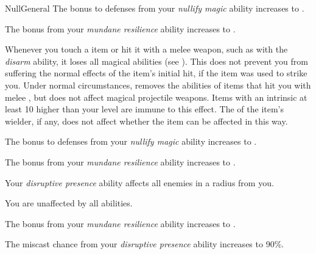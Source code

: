 \begin{feat}{Null}{General}
         The bonus to defenses from your \textit{nullify magic} ability increases to .

         The bonus from your \textit{mundane resilience} ability increases to .

         Whenever you touch a  item or hit it with a melee weapon, such as with the \textit{disarm} ability, it  loses all magical abilities (see ).
        This does not prevent you from suffering the normal effects of the item's initial hit, if the item was used to strike you.
        Under normal circumstances, removes the abilities of items that hit you with melee , but does not affect magical projectile weapons.
        Items with an intrinsic  at least 10 higher than your level are immune to this effect.
        The  of the item's wielder, if any, does not affect whether the item can be affected in this way.

         The bonus to defenses from your \textit{nullify magic} ability increases to .

         The bonus from your \textit{mundane resilience} ability increases to .

         Your \textit{disruptive presence} ability affects all enemies in a \areahuge radius  from you.

         You are unaffected by all  abilities.

         The bonus from your \textit{mundane resilience} ability increases to .

         The miscast chance from your \textit{disruptive presence} ability increases to 90\%.
    \end{feat}

